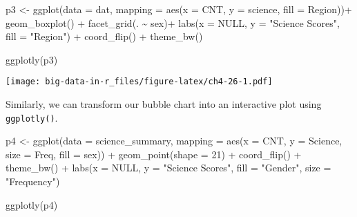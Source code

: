 \documentclass[
]{book}
\newenvironment{Shaded}{\begin{snugshade}}{\end{snugshade}}
\newcommand{\AttributeTok}[1]{\textcolor[rgb]{0.77,0.63,0.00}{#1}}
\newcommand{\ConstantTok}[1]{\textcolor[rgb]{0.00,0.00,0.00}{#1}}
\newcommand{\DecValTok}[1]{\textcolor[rgb]{0.00,0.00,0.81}{#1}}
\newcommand{\FunctionTok}[1]{\textcolor[rgb]{0.00,0.00,0.00}{#1}}
\newcommand{\NormalTok}[1]{#1}
\newcommand{\OtherTok}[1]{\textcolor[rgb]{0.56,0.35,0.01}{#1}}
\newcommand{\SpecialCharTok}[1]{\textcolor[rgb]{0.00,0.00,0.00}{#1}}
\newcommand{\StringTok}[1]{\textcolor[rgb]{0.31,0.60,0.02}{#1}}
\begin{document}
\begin{Shaded}
\begin{Highlighting}[]
\NormalTok{p3 }\OtherTok{\textless{}{-}} \FunctionTok{ggplot}\NormalTok{(}\AttributeTok{data =}\NormalTok{ dat,}
             \AttributeTok{mapping =} \FunctionTok{aes}\NormalTok{(}\AttributeTok{x =}\NormalTok{ CNT, }\AttributeTok{y =}\NormalTok{ science, }\AttributeTok{fill =}\NormalTok{ Region))}\SpecialCharTok{+}
  \FunctionTok{geom\_boxplot}\NormalTok{() }\SpecialCharTok{+}
  \FunctionTok{facet\_grid}\NormalTok{(. }\SpecialCharTok{\textasciitilde{}}\NormalTok{ sex)}\SpecialCharTok{+}
  \FunctionTok{labs}\NormalTok{(}\AttributeTok{x =} \ConstantTok{NULL}\NormalTok{, }\AttributeTok{y =} \StringTok{"Science Scores"}\NormalTok{, }\AttributeTok{fill =} \StringTok{"Region"}\NormalTok{) }\SpecialCharTok{+}
  \FunctionTok{coord\_flip}\NormalTok{() }\SpecialCharTok{+}
  \FunctionTok{theme\_bw}\NormalTok{()}

\FunctionTok{ggplotly}\NormalTok{(p3)}
\end{Highlighting}
\end{Shaded}

\texttt{[image: big-data-in-r\_files/figure-latex/ch4-26-1.pdf]}

Similarly, we can transform our bubble chart into an interactive plot using \texttt{ggplotly()}.

\begin{Shaded}
\begin{Highlighting}[]
\NormalTok{p4 }\OtherTok{\textless{}{-}} \FunctionTok{ggplot}\NormalTok{(}\AttributeTok{data =}\NormalTok{ science\_summary,}
       \AttributeTok{mapping =} \FunctionTok{aes}\NormalTok{(}\AttributeTok{x =}\NormalTok{ CNT, }\AttributeTok{y =}\NormalTok{ Science, }\AttributeTok{size =}\NormalTok{ Freq, }\AttributeTok{fill =}\NormalTok{ sex)) }\SpecialCharTok{+}
  \FunctionTok{geom\_point}\NormalTok{(}\AttributeTok{shape =} \DecValTok{21}\NormalTok{) }\SpecialCharTok{+}
  \FunctionTok{coord\_flip}\NormalTok{() }\SpecialCharTok{+}
  \FunctionTok{theme\_bw}\NormalTok{() }\SpecialCharTok{+}
  \FunctionTok{labs}\NormalTok{(}\AttributeTok{x =} \ConstantTok{NULL}\NormalTok{, }\AttributeTok{y =} \StringTok{"Science Scores"}\NormalTok{, }\AttributeTok{fill =} \StringTok{"Gender"}\NormalTok{,}
       \AttributeTok{size =} \StringTok{"Frequency"}\NormalTok{)}

\FunctionTok{ggplotly}\NormalTok{(p4)}
\end{Highlighting}
\end{Shaded}
\end{document}
